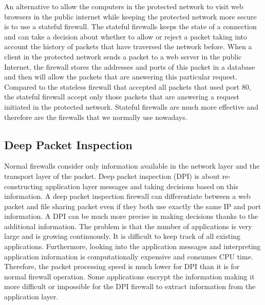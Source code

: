 An alternative to allow the computers in the protected network to visit web browsers in the public internet while keeping the protected network more secure is to use a stateful firewall.
The stateful firewalls keeps the state of a connection and can take a decision about whether to allow or reject a packet taking into account the history of packets that have traversed the network before.
When a client in the protected network sends a packet to a web server in the public Internet, the firewall stores the addresses and ports of this packet in a database and then will allow the packets that are answering this particular request.
Compared to the stateless firewall that accepted all packets that used port 80, the stateful firewall accept only those packets that are answering a request initiated in the protected network.
Stateful firewalls are much more effective and therefore are the firewalls that we normally use nowadays.

\subsection{Deep Packet Inspection}

Normal firewalls consider only information available in the network layer and the transport layer of the packet.
Deep packet inspection (DPI) is about re-constructing application layer messages and taking decisions based on this information.
A deep packet inspection firewall can differentiate between a web packet and file sharing packet even if they both use exactly the same IP and port information.
A DPI can be much more precise in making decisions thanks to the additional information.
The problem is that the number of applications is very large and is growing continuously.
It is difficult to keep track of all existing applications. 
Furthermore, looking into the application messages and interpreting application information is computationally expensive and consumes CPU time.
Therefore, the packet processing speed is much lower for DPI than it is for normal firewall operation.
Some applications encrypt the information making it more difficult or impossible for the DPI firewall to extract information from the application layer.



